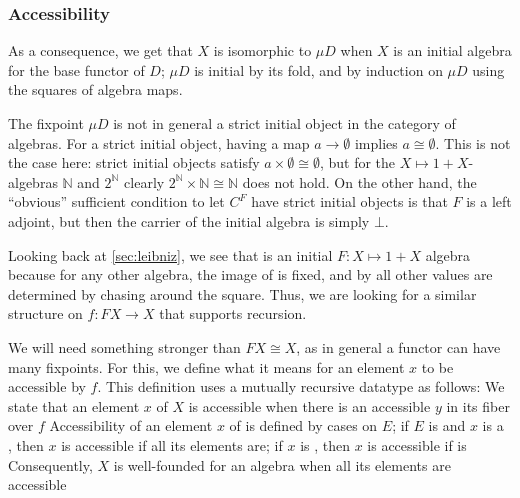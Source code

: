 
\subsubsection{Accessibility}
As a consequence, we get that $X$ is isomorphic to $\mu D$ when $X$ is an initial algebra for the base functor of $D$; $\mu D$ is initial by its fold, and by induction on $\mu D$ using the squares of algebra maps. 

\begin{remark}
    The fixpoint $\mu D$ is not in general a strict initial object in the category of algebras. For a strict initial object, having a map $a \to \emptyset$ implies $a \cong \emptyset$. This is not the case here: strict initial objects satisfy $a \times \emptyset \cong \emptyset$, but for the $X \mapsto 1 + X$-algebras $\mathbb{N}$ and $2^\mathbb{N}$ clearly $2^\mathbb{N} \times \mathbb{N} \cong \mathbb{N}$ does not hold. On the other hand, the ``obvious'' sufficient condition to let $C^F$ have strict initial objects is that $F$ is a left adjoint, but then the carrier of the initial algebra is simply $\bot$.
\end{remark}

Looking back at \autoref{sec:leibniz}, we see that  is an initial $F: X \mapsto 1 + X$ algebra because for any other algebra, the image of  is fixed, and by  all other values are determined by chasing around the square. Thus, we are looking for a similar structure on $f : FX \to X$ that supports recursion.

We will need something stronger than $FX \cong X$, as in general a functor can have many fixpoints. For this, we define what it means for an element $x$ to be accessible by $f$. This definition uses a mutually recursive datatype as follows:
We state that an element $x$ of $X$ is accessible when there is an accessible $y$ in its fiber over $f$
Accessibility of an element $x$ of  is defined by cases on $E$; if $E$ is  and $x$ is a , then $x$ is accessible if all its elements are; if $x$ is , then $x$ is accessible if  is
Consequently, $X$ is well-founded for an algebra when all its elements are accessible

